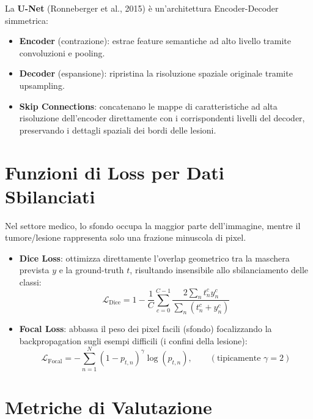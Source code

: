 \documentclass[12pt, a4paper]{report}
\begin{document}
\begin{defbox}[U-Net]
La \textbf{U-Net} (Ronneberger et al., 2015) è un'architettura Encoder-Decoder simmetrica:
\begin{itemize}
  \item \textbf{Encoder} (contrazione): estrae feature semantiche ad alto livello
        tramite convoluzioni e pooling.
  \item \textbf{Decoder} (espansione): ripristina la risoluzione spaziale originale
        tramite upsampling.
  \item \textbf{Skip Connections}: concatenano le mappe di caratteristiche ad alta
        risoluzione dell'encoder direttamente con i corrispondenti livelli del decoder,
        preservando i dettagli spaziali dei bordi delle lesioni.
\end{itemize}
\end{defbox}

\section{Funzioni di Loss per Dati Sbilanciati}

Nel settore medico, lo sfondo occupa la maggior parte dell'immagine, mentre il tumore/lesione
rappresenta solo una frazione minuscola di pixel.

\begin{propbox}
\begin{itemize}
  \item \textbf{Dice Loss}: ottimizza direttamente l'overlap geometrico tra la maschera
        prevista $y$ e la ground-truth $t$, risultando insensibile allo sbilanciamento delle classi:
        \[
          \mathcal{L}_{\text{Dice}} = 1 - \frac{1}{C}\sum_{c=0}^{C-1} \frac{2 \sum_n t_n^c y_n^c}{\sum_n (t_n^c + y_n^c)}
        \]
  \item \textbf{Focal Loss}: abbassa il peso dei pixel facili (sfondo) focalizzando la
        backpropagation sugli esempi difficili (i confini della lesione):
        \[
          \mathcal{L}_{\text{Focal}} = -\sum_{n=1}^N (1 - p_{t,n})^\gamma \log(p_{t,n}), \qquad (\text{tipicamente } \gamma = 2)
        \]
\end{itemize}
\end{propbox}

\section{Metriche di Valutazione}
\end{document}

